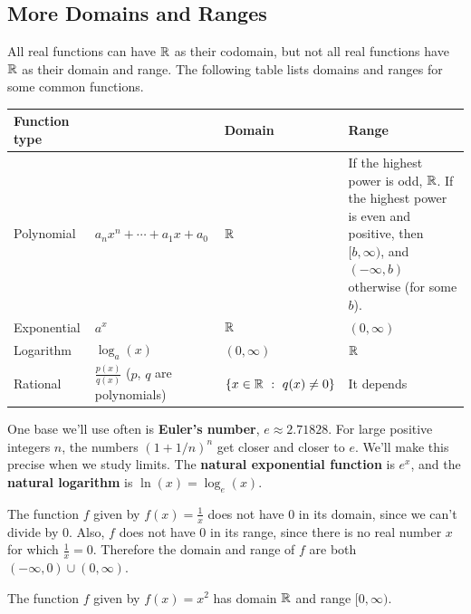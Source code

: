 \subsection{More Domains and Ranges}

All real functions can have $\mathbb{R}$ as their codomain, but not all real functions have $\mathbb{R}$ as their domain and range. The following table lists domains and ranges for some common functions.

\begin{center}
\renewcommand{\arraystretch}{1.3}
\begin{tabular}{@{}p{1in}p{1.6in}lp{2.25in}@{}}
\toprule[0.4mm]
Function type & & Domain & Range \\
\hline
Polynomial & $a_nx^n+\cdots+a_1x+a_0$ & $\mathbb{R}$ & If the highest power is odd, $\mathbb{R}$. If the highest power is even and positive, then $[b,\infty)$, and $(-\infty,b)$ otherwise (for some $b$).\\
Exponential & $a^x$ & $\mathbb{R}$ & $(0,\infty)$\\
Logarithm & $\log_a(x)$ & $(0,\infty)$ & $\mathbb{R}$\\
Rational & $\frac{p(x)}{q(x)}$ \hspace{3in} ($p$, $q$ are polynomials) & $\{x\in\R\ :\ q(x)\neq 0\}$ & It depends\\
\bottomrule[0.4mm]
\end{tabular}
\end{center}

\label{def:eulers-number}
One base we'll use often is \textbf{Euler's number}, $e\approx2.71828$.
For large positive integers $n$, the numbers $(1+1/n)^n$ get closer and
closer to $e$. We'll make this precise when we study limits.
The \textbf{natural exponential function} is $e^x$, and the
\textbf{natural logarithm} is $\ln(x)=\log_e(x)$.


\begin{exampleblock}
The function $f$ given by $f(x)=\frac{1}{x}$ does not have 0 in its domain, since we can't divide by 0. Also, $f$ does not have 0 in its range, since there is no real number $x$ for which $\frac{1}{x}=0$. Therefore the domain and range of $f$ are both $(-\infty,0)\cup(0,\infty)$.
\end{exampleblock}
\begin{exampleblock}
The function $f$ given by $f(x)=x^2$ has domain $\mathbb{R}$ and range $[0,\infty)$.
\end{exampleblock}





